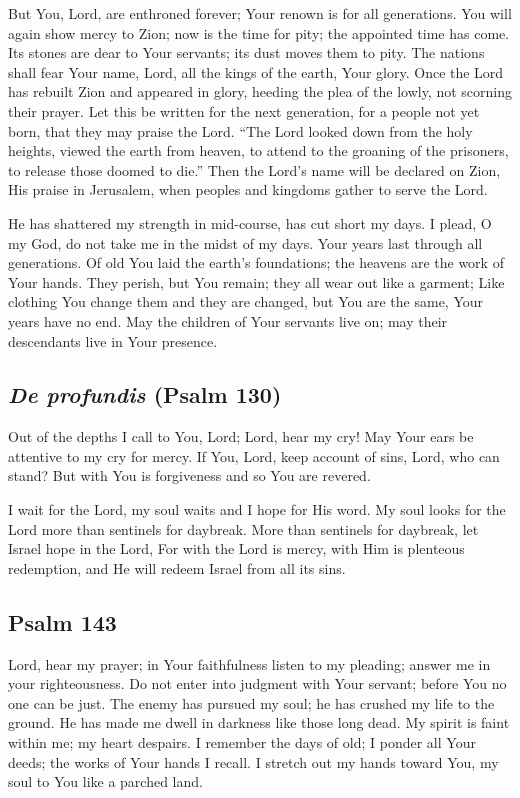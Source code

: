 \documentclass[12pt]{article}
\newcommand{\prayertitle}[1]{\subsection{#1}}
\newcommand{\indulgencedprayertitle}[1]{\prayertitle{#1 \protect\kreuz}}
\newcommand{\foreign}[1]{\textsl{#1}}
\begin{document}
But You, Lord, are enthroned forever;
Your renown is for all generations.
You will again show mercy to Zion;
now is the time for pity;
the appointed time has come.
Its stones are dear to Your servants;
its dust moves them to pity.
The nations shall fear Your name, Lord,
all the kings of the earth, Your glory.
Once the Lord has rebuilt Zion and appeared in glory, heeding the plea of the lowly, not scorning their prayer.
Let this be written for the next generation, for a people not yet born, that they may praise the Lord.
``The Lord looked down from the holy heights, viewed the earth from heaven, to attend to the groaning of the prisoners, to release those doomed to die.''
Then the Lord's name will be declared on Zion, His praise in Jerusalem, when peoples and kingdoms gather to serve the Lord.

He has shattered my strength in mid-course, has cut short my days.
I plead, O my God, do not take me in the midst of my days.
Your years last through all generations.
Of old You laid the earth’s foundations;
the heavens are the work of Your hands.
They perish, but You remain;
they all wear out like a garment;
Like clothing You change them and they are changed, but You are the same, Your years have no end.
May the children of Your servants live on;
may their descendants live in Your presence.

\indulgencedprayertitle{\foreign{De profundis} (Psalm 130)}
Out of the depths I call to You, Lord;
Lord, hear my cry!
May Your ears be attentive to my cry for mercy.
If You, Lord, keep account of sins, Lord, who can stand?
But with You is forgiveness and so You are revered.

I wait for the Lord, my soul waits and I hope for His word.
My soul looks for the Lord more than sentinels for daybreak.
More than sentinels for daybreak, let Israel hope in the Lord,
For with the Lord is mercy, with Him is plenteous redemption, and He will redeem Israel from all its sins.

\indulgencedprayertitle{Psalm 143}
Lord, hear my prayer;
in Your faithfulness listen to my pleading;
answer me in your righteousness.
Do not enter into judgment with Your servant;
before You no one can be just.
The enemy has pursued my soul;
he has crushed my life to the ground.
He has made me dwell in darkness like those long dead.
My spirit is faint within me;
my heart despairs.
I remember the days of old;
I ponder all Your deeds;
the works of Your hands I recall.
I stretch out my hands toward You, my soul to You like a parched land.
\end{document}
